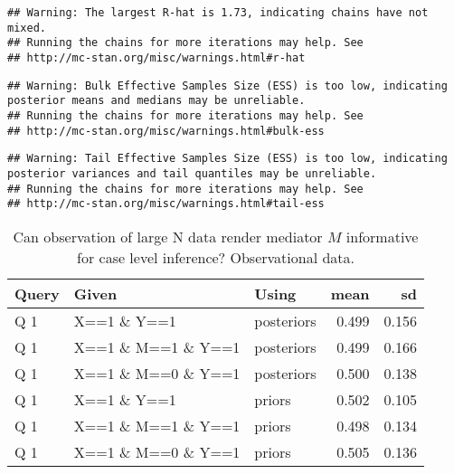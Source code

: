 \documentclass[
  12pt,
]{book}
\begin{document}
\begin{verbatim}
## Warning: The largest R-hat is 1.73, indicating chains have not mixed.
## Running the chains for more iterations may help. See
## http://mc-stan.org/misc/warnings.html#r-hat
\end{verbatim}

\begin{verbatim}
## Warning: Bulk Effective Samples Size (ESS) is too low, indicating posterior means and medians may be unreliable.
## Running the chains for more iterations may help. See
## http://mc-stan.org/misc/warnings.html#bulk-ess
\end{verbatim}

\begin{verbatim}
## Warning: Tail Effective Samples Size (ESS) is too low, indicating posterior variances and tail quantiles may be unreliable.
## Running the chains for more iterations may help. See
## http://mc-stan.org/misc/warnings.html#tail-ess
\end{verbatim}

\begin{table}

\caption{\label{tab:unnamed-chunk-109}Can observation of large N data render mediator $M$ informative for case level inference? Observational data.}
\centering
\begin{tabular}[t]{l|l|l|r|r}
\hline
Query & Given & Using & mean & sd\\
\hline
Q 1 & X==1 \& Y==1 & posteriors & 0.499 & 0.156\\
\hline
Q 1 & X==1 \& M==1 \& Y==1 & posteriors & 0.499 & 0.166\\
\hline
Q 1 & X==1 \& M==0 \& Y==1 & posteriors & 0.500 & 0.138\\
\hline
Q 1 & X==1 \& Y==1 & priors & 0.502 & 0.105\\
\hline
Q 1 & X==1 \& M==1 \& Y==1 & priors & 0.498 & 0.134\\
\hline
Q 1 & X==1 \& M==0 \& Y==1 & priors & 0.505 & 0.136\\
\hline
\end{tabular}
\end{table}
\end{document}
